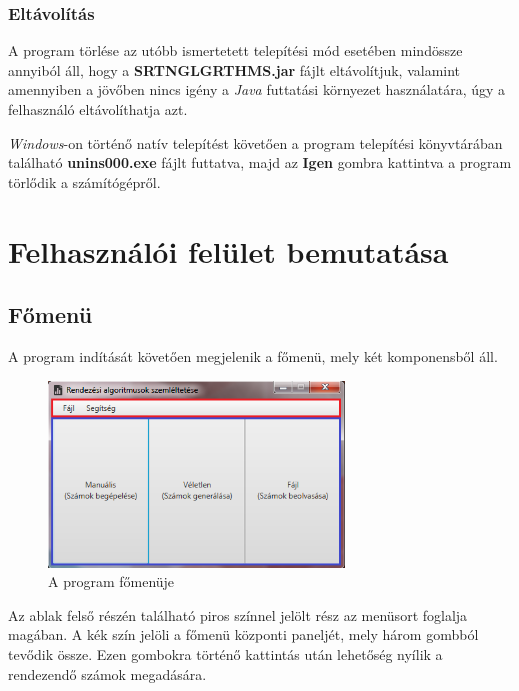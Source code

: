 \documentclass{elteikthesis}
\begin{document}
\subsubsection{Eltávolítás}
A program törlése az utóbb ismertetett telepítési mód esetében mindössze annyiból áll, hogy a \textbf{SRTNGLGRTHMS.jar} fájlt eltávolítjuk, valamint amennyiben a jövőben nincs igény a \emph{Java} futtatási környezet használatára, úgy a felhasználó eltávolíthatja azt.\par
\emph{Windows}-on történő natív telepítést követően a program telepítési könyvtárában található \textbf{unins000.exe} fájlt futtatva, majd az \textbf{Igen} gombra kattintva a program törlődik a számítógépről.

\section{Felhasználói felület bemutatása}
\subsection{Főmenü}
A program indítását követően megjelenik a főmenü, mely két komponensből áll.\par
\begin{figure}[H]
	\centering
	\includegraphics[width=0.7\textwidth]{pics/mainmenu.png}
	\caption{A program főmenüje}
\end{figure}
  Az ablak felső részén található piros színnel jelölt rész az menüsort foglalja magában. A kék szín jelöli a főmenü központi paneljét, mely három gombból tevődik össze. Ezen gombokra történő kattintás után lehetőség nyílik a rendezendő számok megadására.
\end{document}
